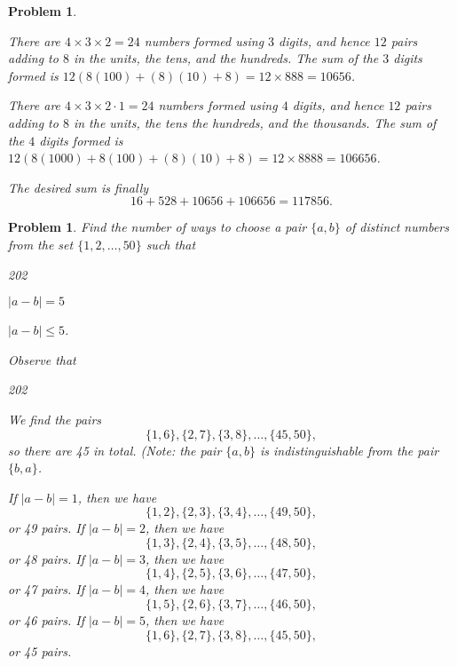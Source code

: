 \documentclass[11pt, openany]{book}
\theoremstyle{change} \theoremheaderfont{\blue\sffamily\bfseries}
\newtheorem{pro}[thm]{Problem}
\theoremstyle{nonumberplain} \theoremheaderfont{\sffamily\bfseries}
\newcommand{\í}{\'{\i}}
\begin{document}
\begin{multicols}{2}
\begin{pro}
\begin{answer}
\bigskip

There are $4\times 3\times 2 = 24$ numbers formed using $3$ digits,
and hence $12$ pairs adding to $8$ in the units, the tens, and the
hundreds. The sum of the $3$ digits formed is $12(8(100) + (8)(10) +
8) = 12\times 888 = 10656$.

\bigskip

There are $4\times 3\times 2\cdot 1 = 24$ numbers formed using $4$
digits, and hence $12$ pairs adding to $8$ in the units, the tens
the hundreds, and the thousands. The sum of the $4$ digits formed is
$12(8(1000) + 8(100) + (8)(10) + 8) = 12\times 8888 = 106656$.

\bigskip

The desired sum is finally
$$16 + 528 + 10656 + 106656 =  117856.$$
\end{answer}
\end{pro}
\begin{pro}
Find the number of ways to choose a pair $\{a , b\}$ of distinct
numbers from the set $\{1, 2, \ldots , 50\}$ such that

\begin{dingautolist}{202}
\item  $|a - b| = 5$ \item $|a - b| \leq 5$.

\end{dingautolist}
\begin{answer} Observe that
\begin{dingautolist}{202}
\item We find the pairs
$$\{1, 6\}, \{2, 7\}, \{3, 8\}, \ldots , \{45, 50\}, $$so there
are 45 in total. (Note: the pair $\{a, b\}$ is indistinguishable
from the pair $\{b, a\}$. \\
\item  If $|a - b| = 1$, then we have
$$\{1, 2\}, \{2, 3\}, \{3, 4\}, \ldots , \{49, 50\},$$or 49 pairs.
If $|a - b| = 2$, then we have
$$\{1, 3\}, \{2, 4\}, \{3, 5\}, \ldots , \{48, 50\},$$or 48 pairs.
If $|a - b| = 3$, then we have
$$\{1, 4\}, \{2, 5\}, \{3, 6\}, \ldots , \{47, 50\},$$or 47 pairs.
If $|a - b| = 4$, then we have
$$\{1, 5\}, \{2, 6\}, \{3, 7\}, \ldots , \{46, 50\},$$or 46 pairs.
If $|a - b| = 5$, then we have
$$\{1, 6\}, \{2, 7\}, \{3, 8\}, \ldots , \{45, 50\},$$or 45 pairs.


\end{dingautolist}
\end{answer}
\end{pro}
\end{multicols}
\end{document}
